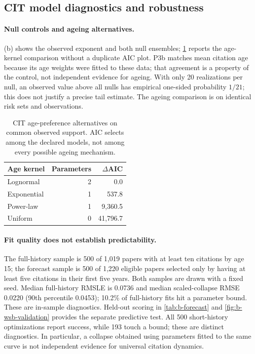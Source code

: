 \subsection{CIT model diagnostics and robustness}
\label{sec:b-diagnostics}
\paragraph{Null controls and ageing alternatives.}
(b) shows the observed exponent and both null ensembles;
\cref{tab:b-age-models} reports the age-kernel comparison without a duplicate AIC plot.
P3b matches mean citation age because its age weights were fitted to these data;
that agreement is a property of the control, not independent evidence for ageing.
With only 20 realizations per null, an observed value above all nulls has empirical
one-sided probability $1/21$; this does not justify a precise tail estimate.
The ageing comparison is on identical risk sets and observations.

\begin{table}[t]
\centering\small
\begin{tabular*}{\columnwidth}{@{\extracolsep{\fill}}lrr@{}}
\toprule
Age kernel & Parameters & $\Delta$AIC\\
\midrule
Lognormal & 2 & 0.0\\
Exponential & 1 & 537.8\\
Power-law & 1 & 9,360.5\\
Uniform & 0 & 41,796.7\\
\bottomrule
\end{tabular*}
\caption{CIT age-preference alternatives on common observed support. AIC selects
among the declared models, not among every possible ageing mechanism.}
\label{tab:b-age-models}
\end{table}



\paragraph{Fit quality does not establish predictability.}
The full-history sample is 500 of 1,019 papers with at least ten citations by age
15; the forecast sample is 500 of 1,220 eligible papers selected only by having
at least five citations in their first five years. Both samples are drawn with a
fixed seed. Median full-history RMSLE is 0.0736 and median scaled-collapse RMSE
0.0220 (90th percentile 0.0453); 10.2\% of full-history fits hit a parameter bound.
These are in-sample diagnostics. Held-out scoring in
\cref{tab:b-forecast} and \cref{fig:b-wsb-validation} provides the separate
predictive test. All 500 short-history optimizations report success, while
193 touch a bound; these are distinct diagnostics. In particular, a collapse
obtained using parameters fitted to
the same curve is not independent evidence for universal citation dynamics.



